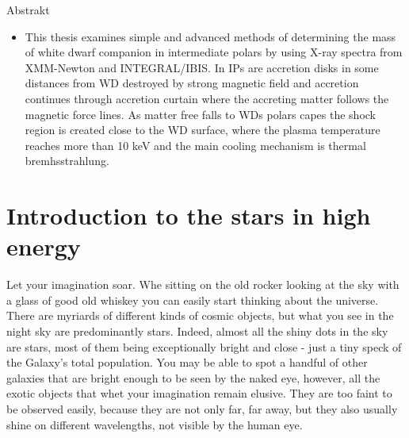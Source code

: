 \documentclass[oneside,a4paper,11pt]{report}
\begin{document}
\pagebreak
\thispagestyle{empty}
\begin{center}
\Large Abstrakt
\end{center}
\begin{itemize}
\item This thesis examines simple and advanced methods of determining the 
mass of white dwarf companion in intermediate polars by using X-ray spectra 
from XMM-Newton and INTEGRAL/IBIS. In IPs are accretion disks in some 
distances from WD destroyed by strong magnetic field and accretion 
continues through accretion curtain where the accreting matter follows 
the magnetic force lines. As matter free falls to WDs polars capes the 
shock region is created close to the WD surface, where the plasma 
temperature reaches more than 10 keV and the main cooling mechanism 
is thermal bremhsstrahlung.
\end{itemize}






\pagebreak
\tableofcontents

\chapter{Introduction to the stars in high energy }

Let your imagination soar. 
Whe sitting on the old rocker looking at the sky with a glass of good old whiskey you can easily 
start thinking about the universe. 
There are myriards of different kinds of cosmic objects, but what you see in the night sky are predominantly stars.
Indeed, almost all the shiny dots in the sky are stars, most of them being exceptionally bright and close - just a tiny
speck of the Galaxy's total population. You may be able to spot a handful of other galaxies that are bright enough to 
be seen by the naked eye, however, all the exotic objects that whet your imagination remain elusive.  
They are too faint to be observed easily, because they are not only far, far away, but they also usually shine 
on different wavelengths, not visible by the human eye.
\end{document}
